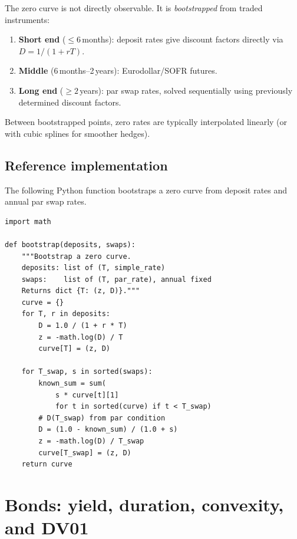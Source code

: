 \begin{keyfactbox}
The zero curve is not directly observable.  It is \emph{bootstrapped}
from traded instruments:
\begin{enumerate}
  \item \textbf{Short end} ($\leq 6$\,months): deposit rates give
    discount factors directly via
    $D = 1/(1+rT)$.
  \item \textbf{Middle} (6\,months--2\,years): Eurodollar/SOFR
    futures.
  \item \textbf{Long end} ($\geq 2$\,years): par swap rates, solved
    sequentially using previously determined discount factors.
\end{enumerate}
Between bootstrapped points, zero rates are typically interpolated
linearly (or with cubic splines for smoother hedges).
\end{keyfactbox}

\subsection{Reference implementation}

The following Python function bootstraps a zero curve from deposit
rates and annual par swap rates.

\begin{lstlisting}[caption={Zero-curve bootstrap from deposits and annual swaps.},
  label={lst:bootstrap}]
import math

def bootstrap(deposits, swaps):
    """Bootstrap a zero curve.
    deposits: list of (T, simple_rate)
    swaps:    list of (T, par_rate), annual fixed
    Returns dict {T: (z, D)}."""
    curve = {}
    for T, r in deposits:
        D = 1.0 / (1 + r * T)
        z = -math.log(D) / T
        curve[T] = (z, D)

    for T_swap, s in sorted(swaps):
        known_sum = sum(
            s * curve[t][1]
            for t in sorted(curve) if t < T_swap)
        # D(T_swap) from par condition
        D = (1.0 - known_sum) / (1.0 + s)
        z = -math.log(D) / T_swap
        curve[T_swap] = (z, D)
    return curve
\end{lstlisting}


\section{Bonds: yield, duration, convexity, and DV01}
\label{sec:fi_bonds}

